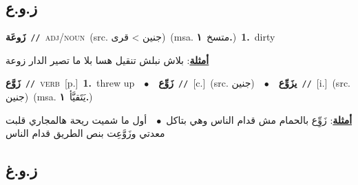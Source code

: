 \documentclass[10pt,a4paper,twoside]{article} %
\begin{document}
\begin{multicols}{2}
\vspace{-3mm}
\subsection*{\color{blue}\foreignlanguage{arabic}{ز.و.ع}\color{blue}{}} 

{\setlength\topsep{0pt}\textbf{\foreignlanguage{arabic}{زَوعَة}}\ {\color{gray}\texttt{//}\color{black}}\ \textsc{adj/noun}\ (src. \color{gray}\foreignlanguage{arabic}{جنين > قرى}\color{black})\ \color{gray}(msa. \foreignlanguage{arabic}{متسخ}~\foreignlanguage{arabic}{\textbf{١.}})\color{black}\ \textbf{1.}~dirty\  \begin{flushright}\color{gray}\foreignlanguage{arabic}{\textbf{\underline{\foreignlanguage{arabic}{أمثلة}}}: بلاش نبلش تنقيل هسا بلا ما تصير الدار زوعة}\end{flushright}\color{black}} \vspace{2mm}

{\setlength\topsep{0pt}\textbf{\foreignlanguage{arabic}{زَوَّع}}\ {\color{gray}\texttt{//}\color{black}}\ \textsc{verb}\ [p.]\ \textbf{1.}~threw up\ \ $\bullet$\ \ \setlength\topsep{0pt}\textbf{\foreignlanguage{arabic}{زَوِّع}}\ {\color{gray}\texttt{//}\color{black}}\ [c.]\ (src. \color{gray}\foreignlanguage{arabic}{جنين}\color{black})\ \ $\bullet$\ \ \setlength\topsep{0pt}\textbf{\foreignlanguage{arabic}{يزَوِّع}}\ {\color{gray}\texttt{//}\color{black}}\ [i.]\ (src. \color{gray}\foreignlanguage{arabic}{جنين}\color{black})\ \color{gray}(msa. \foreignlanguage{arabic}{يَتَقيَّأ}~\foreignlanguage{arabic}{\textbf{١.}})\color{black}\  \begin{flushright}\color{gray}\foreignlanguage{arabic}{\textbf{\underline{\foreignlanguage{arabic}{أمثلة}}}: زَوِِّع بالحمام مش قدام الناس وهي بتاكل\ $\bullet$\ \  أول ما شميت ريحة هالمجاري قلبت معدتي وزَوَّعِت بنص الطريق قدام الناس}\end{flushright}\color{black}} \vspace{2mm}

\vspace{-3mm}
\subsection*{\color{blue}\foreignlanguage{arabic}{ز.و.غ}\color{blue}{}} 


\end{multicols}
\end{document}
